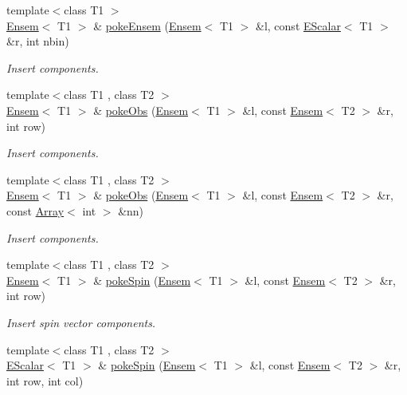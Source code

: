 \begin{DoxyCompactItemize}
\item 
{\footnotesize template$<$class T1 $>$ }\\\mbox{\hyperlink{classENSEM_1_1Ensem}{Ensem}}$<$ T1 $>$ \& \mbox{\hyperlink{group__eensem_gac250f0269fc0f62be437e1f400b3b7b9}{poke\+Ensem}} (\mbox{\hyperlink{classENSEM_1_1Ensem}{Ensem}}$<$ T1 $>$ \&l, const \mbox{\hyperlink{classENSEM_1_1EScalar}{E\+Scalar}}$<$ T1 $>$ \&r, int nbin)
\begin{DoxyCompactList}\small\item\em Insert components. \end{DoxyCompactList}\item 
{\footnotesize template$<$class T1 , class T2 $>$ }\\\mbox{\hyperlink{classENSEM_1_1Ensem}{Ensem}}$<$ T1 $>$ \& \mbox{\hyperlink{group__eensem_ga44fada3144f6b1bb4d161722a389abd9}{poke\+Obs}} (\mbox{\hyperlink{classENSEM_1_1Ensem}{Ensem}}$<$ T1 $>$ \&l, const \mbox{\hyperlink{classENSEM_1_1Ensem}{Ensem}}$<$ T2 $>$ \&r, int row)
\begin{DoxyCompactList}\small\item\em Insert components. \end{DoxyCompactList}\item 
{\footnotesize template$<$class T1 , class T2 $>$ }\\\mbox{\hyperlink{classENSEM_1_1Ensem}{Ensem}}$<$ T1 $>$ \& \mbox{\hyperlink{group__eensem_gaf4969f408bf59ed0fb219c61def36156}{poke\+Obs}} (\mbox{\hyperlink{classENSEM_1_1Ensem}{Ensem}}$<$ T1 $>$ \&l, const \mbox{\hyperlink{classENSEM_1_1Ensem}{Ensem}}$<$ T2 $>$ \&r, const \mbox{\hyperlink{classXMLArray_1_1Array}{Array}}$<$ int $>$ \&nn)
\begin{DoxyCompactList}\small\item\em Insert components. \end{DoxyCompactList}\item 
{\footnotesize template$<$class T1 , class T2 $>$ }\\\mbox{\hyperlink{classENSEM_1_1Ensem}{Ensem}}$<$ T1 $>$ \& \mbox{\hyperlink{group__eensem_ga20ff818f34faa2f1d5067da3ff139ba9}{poke\+Spin}} (\mbox{\hyperlink{classENSEM_1_1Ensem}{Ensem}}$<$ T1 $>$ \&l, const \mbox{\hyperlink{classENSEM_1_1Ensem}{Ensem}}$<$ T2 $>$ \&r, int row)
\begin{DoxyCompactList}\small\item\em Insert spin vector components. \end{DoxyCompactList}\item 
{\footnotesize template$<$class T1 , class T2 $>$ }\\\mbox{\hyperlink{classENSEM_1_1EScalar}{E\+Scalar}}$<$ T1 $>$ \& \mbox{\hyperlink{group__eensem_ga21cbf6a127bd98e6cf1909afe3050089}{poke\+Spin}} (\mbox{\hyperlink{classENSEM_1_1Ensem}{Ensem}}$<$ T1 $>$ \&l, const \mbox{\hyperlink{classENSEM_1_1Ensem}{Ensem}}$<$ T2 $>$ \&r, int row, int col)

\end{DoxyCompactItemize}
